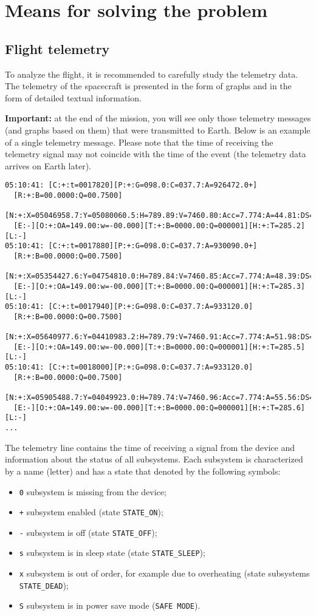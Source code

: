 \documentclass[12pt,a4paper]{article}
\begin{document}
\section{Means for solving the problem}

\subsection{Flight telemetry}
\label{Sec:Telemetry}

To analyze the flight, it is recommended to carefully study the telemetry data. The telemetry of the spacecraft is presented in the form of graphs and in the form of detailed textual information.

\textbf{Important:} at the end of the mission, you will see only those telemetry messages (and graphs based on them) that were transmitted to Earth. Below is an example of a single telemetry message. Please note that the time of receiving the telemetry signal may not coincide with the time of the event (the telemetry data arrives on Earth later).

\begin{verbatim}
05:10:41: [C:+:t=0017820][P:+:G=098.0:C=037.7:A=926472.0+]
  [R:+:B=00.0000:Q=00.7500]
  [N:+:X=05046958.7:Y=05080060.5:H=789.89:V=7460.80:Acc=7.774:A=44.81:DS=-]
  [E:-][O:+:OA=149.00:w=-00.000][T:+:B=0000.00:Q=000001][H:+:T=285.2][L:-]
05:10:41: [C:+:t=0017880][P:+:G=098.0:C=037.7:A=930090.0+]
  [R:+:B=00.0000:Q=00.7500]
  [N:+:X=05354427.6:Y=04754810.0:H=789.84:V=7460.85:Acc=7.774:A=48.39:DS=-]
  [E:-][O:+:OA=149.00:w=-00.000][T:+:B=0000.00:Q=000001][H:+:T=285.3][L:-]
05:10:41: [C:+:t=0017940][P:+:G=098.0:C=037.7:A=933120.0]
  [R:+:B=00.0000:Q=00.7500]
  [N:+:X=05640977.6:Y=04410983.2:H=789.79:V=7460.91:Acc=7.774:A=51.98:DS=-]
  [E:-][O:+:OA=149.00:w=-00.000][T:+:B=0000.00:Q=000001][H:+:T=285.5][L:-]
05:10:41: [C:+:t=0018000][P:+:G=098.0:C=037.7:A=933120.0]
  [R:+:B=00.0000:Q=00.7500]
  [N:+:X=05905488.7:Y=04049923.0:H=789.74:V=7460.96:Acc=7.774:A=55.56:DS=-]
  [E:-][O:+:OA=149.00:w=-00.000][T:+:B=0000.00:Q=000001][H:+:T=285.6][L:-]
...
\end{verbatim}

The telemetry line contains the time of receiving a signal from the device and information about the status of all subsystems. Each subsystem is characterized by a name (letter) and has a state that
denoted by the following symbols:

\begin{itemize}
\item \verb'0' subsystem is missing from the device;
\item \verb'+' subsystem enabled (state \verb'STATE_ON');
\item \verb'-' subsystem is off (state \verb'STATE_OFF');
\item \verb's' subsystem is in sleep state (state \verb'STATE_SLEEP');
\item \verb'x' subsystem is out of order, for example due to overheating (state
   subsystems \verb'STATE_DEAD');
\item \verb'S' subsystem is in power save mode (\verb'SAFE MODE').
\end{itemize}
\end{document}

